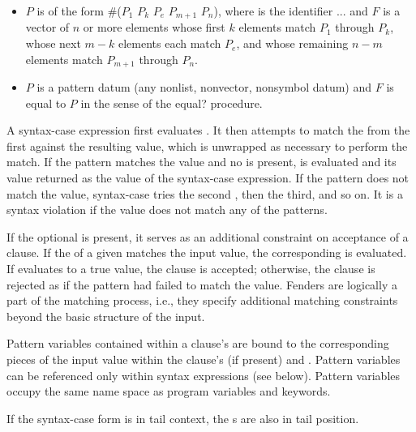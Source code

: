 \begin{entry}
\begin{itemize}
\item $P$ is of the form
{\cf \#($P_1$ \dotsfoo{} $P_k$ $P_e$  $P_{m+1}$ \dotsfoo{} $P_n$)},
where  is the identifier {\cf ...}
and $F$ is a vector of $n$ or more elements
whose first $k$ elements match $P_1$ through $P_k$,
whose next $m-k$ elements each match $P_e$,
and
whose remaining $n-m$ elements match $P_{m+1}$ through $P_n$.

\item $P$ is a pattern datum (any nonlist, nonvector, nonsymbol
datum) and $F$ is equal to $P$ in the sense of the
{\cf equal?} procedure.
\end{itemize}

\semantics
A {\cf syntax-case} expression first evaluates .
It then attempts to match
the  from the first  against the resulting value,
which is unwrapped as necessary to perform the match.
If the pattern matches the value and no
 is present,
 is evaluated and its value returned as the
value of the {\cf syntax-case} expression.
If the pattern does not match the value, {\cf syntax-case} tries
the second , then the third, and so on.
It is a syntax violation if the value does not match any of the patterns.

If the optional  is present, it serves as an additional
constraint on acceptance of a clause.
If the  of a given  matches the input value,
the corresponding  is evaluated.
If  evaluates to a true value, the clause is accepted;
otherwise, the clause is rejected as if the pattern had failed to match
the value.
Fenders are logically a part of the matching process, i.e., they
specify additional matching constraints beyond the basic structure of
the input.

Pattern variables contained within a clause's
 are bound to the corresponding pieces of the input
value within the clause's  (if present) and
.
Pattern variables can be referenced only within {\cf syntax}
expressions (see below).
Pattern variables occupy the same name space as program variables and
keywords.

If the {\cf syntax-case} form is in tail context, the s are also in tail position.
\end{entry}

